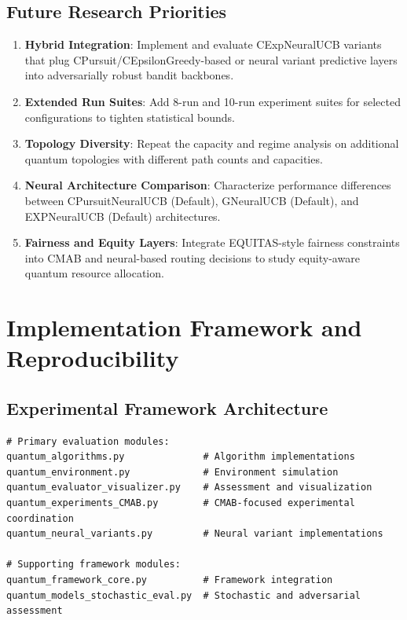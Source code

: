 \documentclass[12pt,a4paper]{article}
\begin{document}
\subsection{Future Research Priorities}

\begin{enumerate}
\item \textbf{Hybrid Integration}: Implement and evaluate CExpNeuralUCB variants that plug CPursuit/CEpsilonGreedy-based or neural variant predictive layers into adversarially robust bandit backbones.
\item \textbf{Extended Run Suites}: Add 8-run and 10-run experiment suites for selected configurations to tighten statistical bounds.
\item \textbf{Topology Diversity}: Repeat the capacity and regime analysis on additional quantum topologies with different path counts and capacities.
\item \textbf{Neural Architecture Comparison}: Characterize performance differences between CPursuitNeuralUCB (Default), GNeuralUCB (Default), and EXPNeuralUCB (Default) architectures.
\item \textbf{Fairness and Equity Layers}: Integrate EQUITAS-style fairness constraints into CMAB and neural-based routing decisions to study equity-aware quantum resource allocation.
\end{enumerate}

\section{Implementation Framework and Reproducibility}

\subsection{Experimental Framework Architecture}

\begin{lstlisting}[caption=Core Framework Components]
# Primary evaluation modules:
quantum_algorithms.py              # Algorithm implementations
quantum_environment.py             # Environment simulation
quantum_evaluator_visualizer.py    # Assessment and visualization
quantum_experiments_CMAB.py        # CMAB-focused experimental coordination
quantum_neural_variants.py         # Neural variant implementations

# Supporting framework modules:
quantum_framework_core.py          # Framework integration
quantum_models_stochastic_eval.py  # Stochastic and adversarial assessment
\end{lstlisting}
\end{document}
